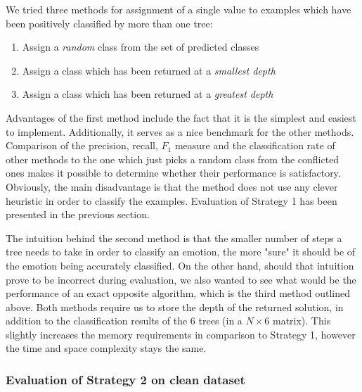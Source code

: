 \documentclass[a4paper]{article}
\begin{document}
We tried three methods for assignment of a single value to examples which have been positively classified by more than one tree:
\begin{enumerate} \itemsep0pt \parskip0pt 
  \item Assign a \emph{random} class from the set of predicted classes
  \item Assign a class which has been returned at a \emph{smallest depth}
  \item Assign a class which has been returned at a \emph{greatest depth}
\end{enumerate}
Advantages of the first method include the fact that it is the simplest and easiest to implement. Additionally, it serves as a nice benchmark for the other methods. Comparison of the precision, recall, $F_1$ measure and the classification rate of other methods to the one which just picks a random class from the conflicted ones makes it possible to determine whether their performance is satisfactory. Obviously, the main disadvantage is that the method does not use any clever heuristic in order to classify the examples. Evaluation of Strategy 1 has been presented in the previous section. \medskip

The intuition behind the second method is that the smaller number of steps a tree needs to take in order to classify an emotion, the more "sure" it should be of the emotion being accurately classified. On the other hand, should that intuition prove to be incorrect during evaluation, we also wanted to see what would be the performance of an exact opposite algorithm, which is the third method outlined above. Both methods require us to store the depth of the returned solution, in addition to the classification results of the 6 trees (in a $N\times6$ matrix). This slightly increases the memory requirements in comparison to Strategy 1, however the time and space complexity stays the same.

\subsubsection{Evaluation of Strategy 2 on clean dataset}
\end{document}
